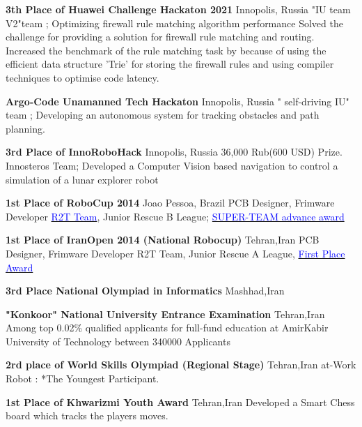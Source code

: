 {\textbf{3th Place of Huawei Challenge Hackaton 2021}}
{Innopolis, Russia}
{}
{}
{
"IU team V2"team ; Optimizing firewall rule matching algorithm performance
Solved the challenge for providing a solution for firewall rule matching and routing. 
        Increased the benchmark of the rule matching task by  because of using the efficient data structure 'Trie' for storing the firewall rules and using compiler techniques to optimise code latency. 
 }

{\textbf{Argo-Code Unamanned Tech Hackaton }}
{Innopolis, Russia}
{}
{}
{
" self-driving IU" team ; Developing an autonomous system for tracking obstacles and path planning. 
} 
 
{\textbf{3rd Place of InnoRoboHack }}
{Innopolis, Russia}
{}
{}
{
36,000 Rub(600 USD) Prize.
Innosteros Team; Developed a Computer Vision based navigation to control a simulation of a lunar explorer robot 
}
 
{\textbf{1st Place of RoboCup 2014}}
{Joao Pessoa, Brazil}
{\newline PCB Designer, Frimware Developer}
{}
{
\href{http://www.robocup2014.org/?page_id=3318}{\textcolor{blue}{R2T Team}}, Junior Rescue B League; \href{https://drive.google.com/file/d/1r-OCgC7kt6sOVfw2KTvrFq5kaBQ-nFiU/view?usp=sharing}{\textcolor{blue}{SUPER-TEAM advance award}}}


 
{\textbf{1st Place of IranOpen 2014 (National Robocup)}}
{Tehran,Iran}
{\newline PCB Designer, Frimware Developer}
{}
{
	R2T Team, Junior Rescue A League, \href{https://drive.google.com/file/d/1SVeY8KieeonJo1rX8eTNVhbd5ya61Gct/view?usp=sharing}{\textcolor{blue}{First Place Award}}
}

{\textbf{3rd Place National Olympiad in Informatics }}
{Mashhad,Iran}
{}
{}
{	
}


{\textbf{"Konkoor" National University Entrance Examination}}
{Tehran,Iran}
{}
{}
{
Among top 0.02\% qualified applicants for full-fund education at AmirKabir University of Technology between 340000 Applicants
}


{\textbf{2rd place of World Skills Olympiad (Regional Stage)}}
{Tehran,Iran}
{}
{}
{
  at-Work Robot : *The Youngest Participant.
}

{\textbf{1st Place of Khwarizmi Youth Award }}
{Tehran,Iran}
{}
{}
{
    Developed a Smart Chess board which tracks the players moves.
}



